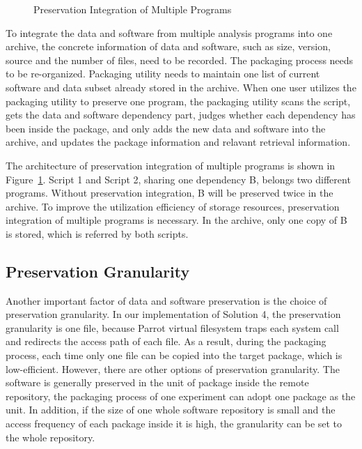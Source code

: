 \documentclass{acm_proc_article-sp}
\begin{document}
\begin{figure}
\centering
{}
\caption{Preservation Integration of Multiple Programs}
\label{fig:Preservation integration}
\end{figure}

To integrate the data and software from multiple analysis programs into one
archive, the concrete information of data and software, such as size, version,
source and the number of files, need to be recorded. 
The packaging
process needs to be re-organized. Packaging utility needs to maintain one list
of current software and data subset already stored in the archive. When one
user utilizes the packaging utility to preserve one program, the
packaging utility scans the script, gets the data and software dependency
part, judges whether each dependency has been inside the package, and only adds
the new data and software into the archive, and updates the package information
and relavant retrieval information.

The architecture of preservation integration of multiple programs is shown in
Figure~\ref{fig:Preservation integration}. Script 1 and Script 2, sharing one
dependency B, belongs two different programs. Without preservation
integration, B will be preserved twice in the archive. To improve the utilization efficiency of storage resources,
preservation integration of multiple programs is necessary. In the archive,
only one copy of B is stored, which is referred by both scripts.

\subsection{Preservation Granularity}

Another important factor of data and software preservation is the choice of
preservation granularity. In our implementation of Solution 4, the preservation granularity is one
file, because Parrot virtual filesystem traps each system call and redirects
the access path of each file. As a result, during the packaging process, each
time only one file can be copied into the target package, which is
low-efficient. However, there are other options of preservation granularity.
The software is generally preserved in the unit of package inside the remote
repository, the packaging process of one experiment can adopt one package as
the unit. In addition, if the size of one whole software repository is small
and the access frequency of each package inside it is high, the granularity can
be set to the whole repository.
\end{document}
